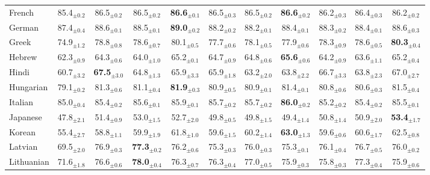\begin{table*}[ht]
{\begin{tabular}{lcccccccccc}
French & 85.4$_{\pm 0.2}$ & 86.5$_{\pm 0.2}$ & 86.5$_{\pm 0.2}$ & \textbf{86.6}$_{\pm 0.1}$ & 86.5$_{\pm 0.3}$ & 86.5$_{\pm 0.2}$ & \textbf{86.6}$_{\pm 0.2}$ & 86.2$_{\pm 0.3}$ & 86.4$_{\pm 0.3}$ & 86.2$_{\pm 0.2}$ \\
German & 87.4$_{\pm 0.4}$ & 88.6$_{\pm 0.1}$ & 88.5$_{\pm 0.1}$ & \textbf{89.0}$_{\pm 0.2}$ & 88.2$_{\pm 0.2}$ & 88.2$_{\pm 0.1}$ & 88.4$_{\pm 0.1}$ & 88.3$_{\pm 0.2}$ & 88.4$_{\pm 0.1}$ & 88.6$_{\pm 0.3}$ \\
Greek & 74.9$_{\pm 1.2}$ & 78.8$_{\pm 0.8}$ & 78.6$_{\pm 0.7}$ & 80.1$_{\pm 0.5}$ & 77.7$_{\pm 0.6}$ & 78.1$_{\pm 0.5}$ & 77.9$_{\pm 0.6}$ & 78.3$_{\pm 0.9}$ & 78.6$_{\pm 0.5}$ & \textbf{80.3}$_{\pm 0.4}$ \\
Hebrew & 62.3$_{\pm 0.9}$ & 64.3$_{\pm 0.6}$ & 64.0$_{\pm 1.0}$ & 65.2$_{\pm 0.1}$ & 64.7$_{\pm 0.9}$ & 64.8$_{\pm 0.6}$ & \textbf{65.6}$_{\pm 0.6}$ & 64.2$_{\pm 0.9}$ & 63.6$_{\pm 1.1}$ & 65.2$_{\pm 0.4}$ \\
Hindi & 60.7$_{\pm 3.2}$ & \textbf{67.5}$_{\pm 3.0}$ & 64.8$_{\pm 1.3}$ & 65.9$_{\pm 3.3}$ & 65.9$_{\pm 1.8}$ & 63.2$_{\pm 2.0}$ & 63.8$_{\pm 2.2}$ & 66.7$_{\pm 3.3}$ & 63.8$_{\pm 2.3}$ & 67.0$_{\pm 2.7}$ \\
Hungarian & 79.1$_{\pm 0.2}$ & 81.3$_{\pm 0.6}$ & 81.1$_{\pm 0.4}$ & \textbf{81.9}$_{\pm 0.3}$ & 80.9$_{\pm 0.5}$ & 80.9$_{\pm 0.1}$ & 81.4$_{\pm 0.1}$ & 80.8$_{\pm 0.6}$ & 80.6$_{\pm 0.3}$ & 81.5$_{\pm 0.4}$ \\
Italian & 85.0$_{\pm 0.4}$ & 85.4$_{\pm 0.2}$ & 85.6$_{\pm 0.1}$ & 85.9$_{\pm 0.1}$ & 85.7$_{\pm 0.2}$ & 85.7$_{\pm 0.2}$ & \textbf{86.0}$_{\pm 0.2}$ & 85.2$_{\pm 0.2}$ & 85.4$_{\pm 0.2}$ & 85.5$_{\pm 0.1}$ \\
Japanese & 47.8$_{\pm 2.1}$ & 51.4$_{\pm 0.9}$ & 53.0$_{\pm 1.5}$ & 52.7$_{\pm 2.0}$ & 49.8$_{\pm 0.5}$ & 49.8$_{\pm 1.5}$ & 49.4$_{\pm 1.4}$ & 50.8$_{\pm 1.4}$ & 50.9$_{\pm 2.0}$ & \textbf{53.4}$_{\pm 1.7}$ \\
Korean & 55.4$_{\pm 2.7}$ & 58.8$_{\pm 1.1}$ & 59.9$_{\pm 1.9}$ & 61.8$_{\pm 1.0}$ & 59.6$_{\pm 1.5}$ & 60.2$_{\pm 1.4}$ & \textbf{63.0}$_{\pm 1.3}$ & 59.6$_{\pm 0.6}$ & 60.6$_{\pm 1.7}$ & 62.5$_{\pm 0.8}$ \\
Latvian & 69.5$_{\pm 2.0}$ & 76.9$_{\pm 0.3}$ & \textbf{77.3}$_{\pm 0.2}$ & 76.2$_{\pm 0.6}$ & 75.3$_{\pm 0.3}$ & 76.0$_{\pm 0.3}$ & 75.3$_{\pm 0.1}$ & 76.1$_{\pm 0.4}$ & 76.7$_{\pm 0.5}$ & 76.0$_{\pm 0.2}$ \\
Lithuanian & 71.6$_{\pm 1.8}$ & 76.6$_{\pm 0.6}$ & \textbf{78.0}$_{\pm 0.4}$ & 76.3$_{\pm 0.7}$ & 76.3$_{\pm 0.4}$ & 77.0$_{\pm 0.5}$ & 75.9$_{\pm 0.3}$ & 75.8$_{\pm 0.3}$ & 77.3$_{\pm 0.4}$ & 75.9$_{\pm 0.6}$ \\

\end{tabular}}
\end{table*}
